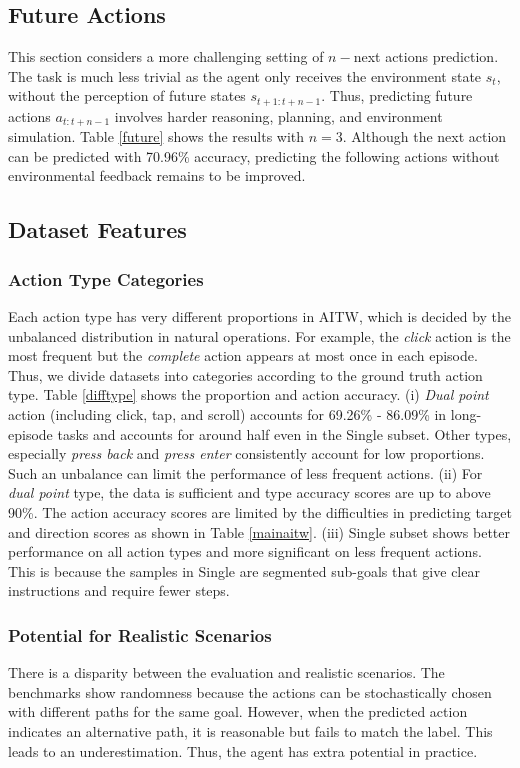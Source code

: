 \subsection{Future Actions}
\label{53}
This section considers a more challenging setting of $n-$next actions prediction. 
The task is much less trivial as the agent only receives the environment state $s_t$, without the perception of future states $s_{t+1:t+n-1}$.
Thus, predicting future actions $a_{t:t+n-1}$ involves harder reasoning, planning, and environment simulation.
Table \ref{future} shows the results with $n=3$. Although the next action can be predicted with 70.96\% accuracy, predicting the following actions without environmental feedback remains to be improved.

\subsection{Dataset Features} 
\label{54}
\subsubsection{Action Type Categories}
Each action type has very different proportions in AITW, which is decided by the unbalanced distribution in natural operations. For example, the \textit{click} action is the most frequent but the \textit{complete} action appears at most once in each episode.
Thus, we divide datasets into categories according to the ground truth action type. Table \ref{difftype} shows the proportion and action accuracy.
(i) \textit{Dual point} action (including click, tap, and scroll) accounts for 69.26\% - 86.09\% in long-episode tasks and accounts for around half even in the Single subset. Other types, especially \textit{press back} and \textit{press enter} consistently account for low proportions.
Such an unbalance can limit the performance of less frequent actions.
(ii) For \textit{dual point} type, the data is sufficient and type accuracy scores are up to above 90\%. The action accuracy scores are limited by the difficulties in predicting target and direction scores as shown in Table \ref{mainaitw}. 
(iii) Single subset shows better performance on all action types and more significant on less frequent actions.
This is because the samples in Single are segmented sub-goals that give clear instructions and require fewer steps.

\subsubsection{Potential for Realistic Scenarios}
\label{542}
There is a disparity between the evaluation and realistic scenarios.
The benchmarks show randomness because the actions can be stochastically chosen with different paths for the same goal.
However, when the predicted action indicates an alternative path, it is reasonable but fails to match the label.
This leads to an underestimation. Thus, the agent has extra potential in practice. 

